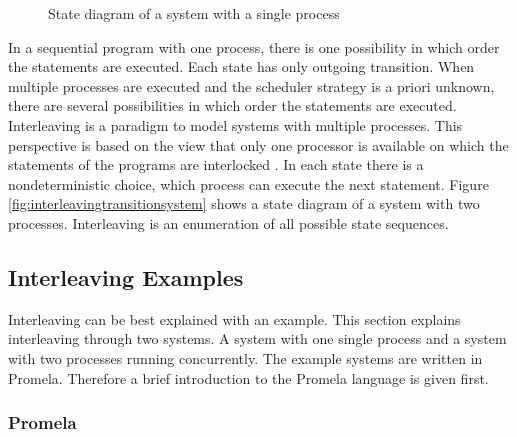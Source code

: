 \documentclass[12pt,a4paper,twoside]{article}
\begin{document}
\begin{figure}
 \centering

  \caption{State diagram of a system with a single process}
  \label{fig:sequencielstatediagram}
\end{figure}

In a sequential program with one process, there is one possibility in which order the statements are executed. Each state has only outgoing transition. When multiple processes are executed and the scheduler strategy is a priori unknown, there are several possibilities in which order the statements are executed. Interleaving is a paradigm to model systems with multiple processes. This perspective is based on the view that only one processor is available on which the statements of the programs are interlocked \cite{baier08}. In each state there is a nondeterministic choice, which process can execute the next statement. Figure \ref{fig:interleavingtransitionsystem} shows a state diagram of a system with two processes. Interleaving is an enumeration of all possible state sequences.

\subsection{Interleaving Examples}
\label{sec:interleavingexamples}

Interleaving can be best explained with an example. This section explains interleaving through two systems. A system with one single process and a system with two processes running concurrently. The example systems are written in Promela. Therefore a brief introduction to the Promela language is given first.

\subsubsection{Promela}
\label{sec:promela}
\end{document}
